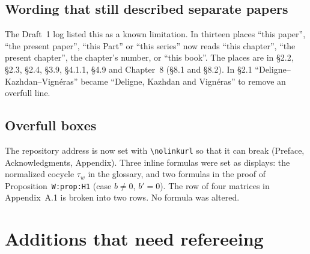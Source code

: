 \documentclass[12pt,letterpaper]{article}
\begin{document}
\subsection{Wording that still described separate papers}
The Draft~1 log listed this as a known limitation. In thirteen places ``this paper'', ``the present paper'', ``this Part'' or ``this series'' now reads ``this chapter'', ``the present chapter'', the chapter's number, or ``this book''. The places are in \S2.2, \S2.3, \S2.4, \S3.9, \S4.1.1, \S4.9 and Chapter~8 (\S8.1 and \S8.2). In \S2.1 ``Deligne--Kazhdan--Vign\'eras'' became ``Deligne, Kazhdan and Vign\'eras'' to remove an overfull line.

\subsection{Overfull boxes}
The repository address is now set with \verb|\nolinkurl| so that it can break (Preface, Acknowledgments, Appendix). Three inline formulas were set as displays: the normalized cocycle $\tau_w$ in the glossary, and two formulas in the proof of Proposition~\texttt{W:prop:H1} (case $b\neq0$, $b'=0$). The row of four matrices in Appendix~A.1 is broken into two rows. No formula was altered.

\section{Additions that need refereeing}\label{sec:additions}
\end{document}
